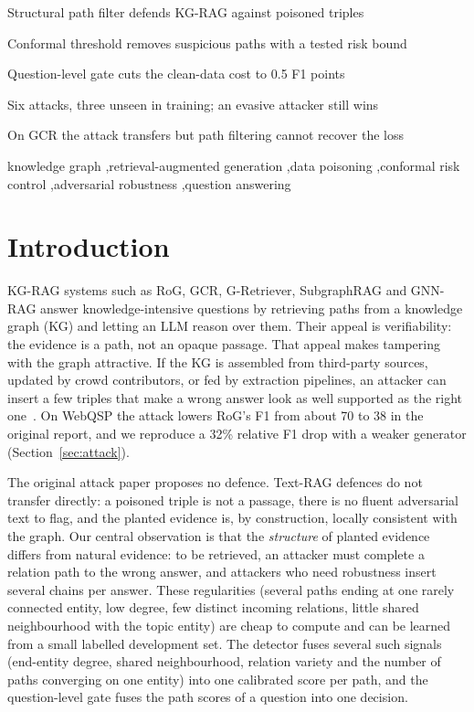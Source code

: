 \documentclass[preprint,12pt]{elsarticle}
\begin{document}
\begin{frontmatter}
\begin{highlights}
\item Structural path filter defends KG-RAG against poisoned triples
\item Conformal threshold removes suspicious paths with a tested risk bound
\item Question-level gate cuts the clean-data cost to 0.5 F1 points
\item Six attacks, three unseen in training; an evasive attacker still wins
\item On GCR the attack transfers but path filtering cannot recover the loss
\end{highlights}

\begin{keyword}
knowledge graph \sep retrieval-augmented generation \sep data poisoning \sep conformal risk control \sep adversarial robustness \sep question answering
\end{keyword}

\end{frontmatter}

\section{Introduction}
KG-RAG systems such as RoG, GCR, G-Retriever, SubgraphRAG and GNN-RAG answer knowledge-intensive questions by retrieving paths from a knowledge graph (KG) and letting an LLM reason over them. Their appeal is verifiability: the evidence is a path, not an opaque passage. That appeal makes tampering with the graph attractive. If the KG is assembled from third-party sources, updated by crowd contributors, or fed by extraction pipelines, an attacker can insert a few triples that make a wrong answer look as well supported as the right one~\cite{zhao2025}. On WebQSP the attack lowers RoG's F1 from about 70 to 38 in the original report, and we reproduce a 32\% relative F1 drop with a weaker generator (Section~\ref{sec:attack}).

The original attack paper proposes no defence. Text-RAG defences do not transfer directly: a poisoned triple is not a passage, there is no fluent adversarial text to flag, and the planted evidence is, by construction, locally consistent with the graph. Our central observation is that the \emph{structure} of planted evidence differs from natural evidence: to be retrieved, an attacker must complete a relation path to the wrong answer, and attackers who need robustness insert several chains per answer. These regularities (several paths ending at one rarely connected entity, low degree, few distinct incoming relations, little shared neighbourhood with the topic entity) are cheap to compute and can be learned from a small labelled development set. The detector fuses several such signals (end-entity degree, shared neighbourhood, relation variety and the number of paths converging on one entity) into one calibrated score per path, and the question-level gate fuses the path scores of a question into one decision.
\end{document}
